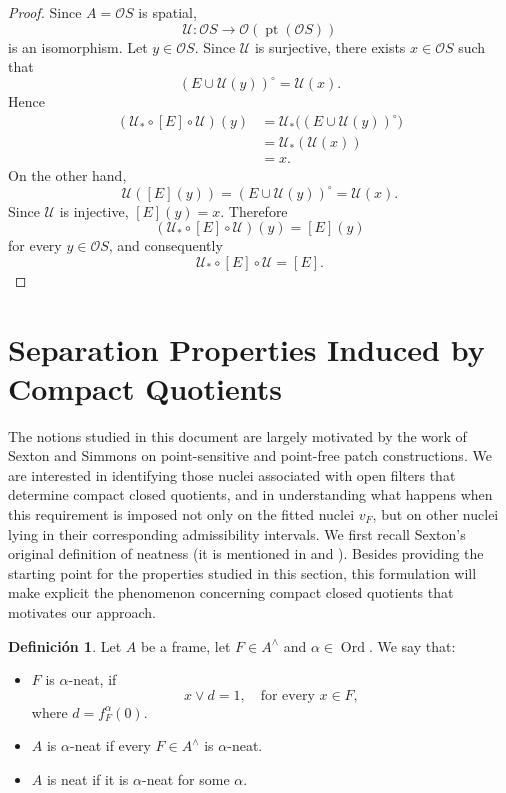 \documentclass[11pt]{amsart}
\DeclareMathOperator{\pt}{pt}
\DeclareMathOperator{\Ord}{Ord}
\theoremstyle{plain}
\theoremstyle{definition}
\newtheorem{dfn}[thm]{Definición}
\begin{document}
\begin{proof}
Since \(A=\mathcal O S\) is spatial,
\[
\mathcal U:\mathcal O S\longrightarrow\mathcal O(\pt(\mathcal O S))
\]
is an isomorphism. Let \(y\in\mathcal O S\). Since \(\mathcal U\) is surjective, there exists \(x\in\mathcal O S\) such that
\[
(E\cup\mathcal U(y))^\circ=\mathcal U(x).
\]
Hence
\[
\begin{aligned}
(\mathcal U_*\circ[E]\circ\mathcal U)(y)
&=\mathcal U_*\bigl((E\cup\mathcal U(y))^\circ\bigr)\\
&=\mathcal U_*(\mathcal U(x))\\
&=x.
\end{aligned}
\]
On the other hand,
\[
\mathcal U([E](y))
=(E\cup\mathcal U(y))^\circ
=\mathcal U(x).
\]
Since \(\mathcal U\) is injective, \([E](y)=x\). Therefore
\[
(\mathcal U_*\circ[E]\circ\mathcal U)(y)=[E](y)
\]
for every \(y\in\mathcal O S\), and consequently
\[
\mathcal U_*\circ[E]\circ\mathcal U=[E].
\]
\end{proof}

\section{Separation Properties Induced by Compact Quotients}\label{Definiciones}
The notions studied in this document are largely motivated by the work of Sexton and Simmons on point-sensitive
and point-free patch constructions. We are interested in identifying those nuclei associated with open filters 
that determine compact closed quotients, and in understanding what happens when this requirement is imposed not only on 
the fitted nuclei \(v_F\), but on other nuclei lying in their corresponding admissibility intervals.
We first recall Sexton's original definition of neatness (it is mentioned in \cite[Definition 4.3]{sexton2006ordinal} and \cite[Definition 8.2.1]{sexton2003}). Besides providing the starting point 
for the properties studied in this section, this formulation will make explicit the phenomenon concerning compact closed quotients that motivates our approach.
\begin{dfn}\label{Neat}
Let $A$ be a frame, let $F\in A^\wedge$ and $\alpha\in \Ord$. We say that:
\begin{itemize}
	\item $F$ is $\alpha$-neat, if 
	\[
	x\vee d=1, \quad \text{for every }x\in F,
	\]
	where $d=f^\alpha_F(0)$.
	\item $A$ is $\alpha$-neat if every $F\in A^\wedge$ is $\alpha$-neat.
	\item $A$ is neat if it is $\alpha$-neat for some $\alpha$. 
\end{itemize}
\end{dfn}
\end{document}
